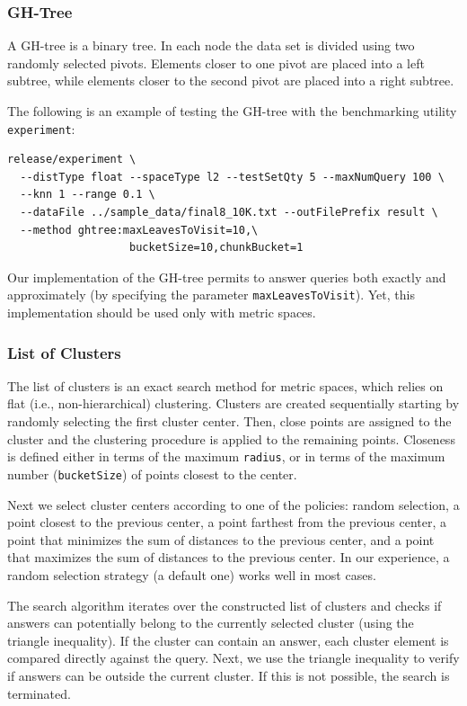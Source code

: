 \documentclass[runningheads,a4paper]{llncs}
\newcommand{\ttt}[1]{\texttt{#1}}
\begin{document}
{\subsubsection{GH-Tree}
A GH-tree \cite{Uhlmann:1991} is a binary tree. In each node the data set is divided using
two randomly selected pivots. Elements closer to one pivot are placed into a left
subtree, while elements closer to the second pivot are placed into a right subtree.

The following is an example of testing the GH-tree with the benchmarking utility \ttt{experiment}:
{
\footnotesize
\begin{verbatim}
release/experiment \
  --distType float --spaceType l2 --testSetQty 5 --maxNumQuery 100 \
  --knn 1 --range 0.1 \
  --dataFile ../sample_data/final8_10K.txt --outFilePrefix result \
  --method ghtree:maxLeavesToVisit=10,\
                   bucketSize=10,chunkBucket=1
\end{verbatim}
}

Our implementation of the GH-tree permits to answer queries both exactly and approximately (by specifying
the parameter \ttt{maxLeavesToVisit}). Yet, this implementation should be used only with metric spaces.

\subsubsection{List of Clusters}\label{SectionListClust}
The list of clusters \cite{chavez2005compact} is an exact search method for metric spaces,
which relies on flat (i.e., non-hierarchical) clustering.
Clusters are created sequentially starting by randomly selecting the first cluster center.
Then, close points are assigned to the cluster and the clustering procedure
is applied to the remaining points.
Closeness is defined either in terms of the maximum \ttt{radius},
or in terms of the maximum number (\ttt{bucketSize}) of points closest to the center.

Next we select cluster centers according to one of the policies:
random selection, a point closest to the previous center,
a point farthest from the previous center, a point that minimizes
the sum of distances to the previous center, and a point that maximizes  
the sum of distances to the previous center.
In our experience, a random selection strategy (a default one)
works well in most cases.

The search algorithm iterates over the constructed list of clusters and
checks if answers can potentially belong to the currently selected cluster
 (using the triangle inequality).
If the cluster can contain an answer,
each cluster element is compared directly against the query.
Next, we use the triangle inequality to verify if answers can
be outside the current cluster.
If this is not possible, the search is terminated.

}
\end{document}
